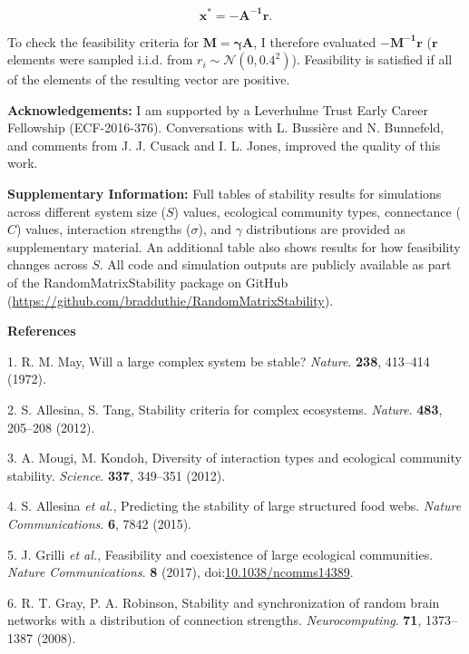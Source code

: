 \documentclass[]{article}
\begin{document}
\[\mathbf{x^{*} = -A^{-1}r}.\]

To check the feasibility criteria for \(\mathbf{M = \gamma A}\), I
therefore evaluated \(\mathbf{-M^{-1}r}\) (\(\mathbf{r}\) elements were
sampled i.i.d. from \(r_{i} \sim \mathcal{N}(0, 0.4^{2})\)). Feasibility
is satisfied if all of the elements of the resulting vector are
positive.

\textbf{Acknowledgements:} I am supported by a Leverhulme Trust Early
Career Fellowship (ECF-2016-376). Conversations with L. Bussière and N.
Bunnefeld, and comments from J. J. Cusack and I. L. Jones, improved the
quality of this work.

\textbf{Supplementary Information:} Full tables of stability results for
simulations across different system size (\(S\)) values, ecological
community types, connectance (\(C\)) values, interaction strengths
(\(\sigma\)), and \(\gamma\) distributions are provided as supplementary
material. An additional table also shows results for how feasibility
changes across \(S\). All code and simulation outputs are publicly
available as part of the RandomMatrixStability package on GitHub
(\url{https://github.com/bradduthie/RandomMatrixStability}).

\textbf{References}

\hypertarget{refs}{}
\hypertarget{ref-May1972}{}
1. R. M. May, Will a large complex system be stable? \emph{Nature}.
\textbf{238}, 413--414 (1972).

\hypertarget{ref-Allesina2012}{}
2. S. Allesina, S. Tang, Stability criteria for complex ecosystems.
\emph{Nature}. \textbf{483}, 205--208 (2012).

\hypertarget{ref-Mougi2012}{}
3. A. Mougi, M. Kondoh, Diversity of interaction types and ecological
community stability. \emph{Science}. \textbf{337}, 349--351 (2012).

\hypertarget{ref-Allesina2015}{}
4. S. Allesina \emph{et al.}, Predicting the stability of large
structured food webs. \emph{Nature Communications}. \textbf{6}, 7842
(2015).

\hypertarget{ref-Grilli2017}{}
5. J. Grilli \emph{et al.}, Feasibility and coexistence of large
ecological communities. \emph{Nature Communications}. \textbf{8} (2017),
doi:\href{https://doi.org/10.1038/ncomms14389}{10.1038/ncomms14389}.

\hypertarget{ref-Gray2008}{}
6. R. T. Gray, P. A. Robinson, Stability and synchronization of random
brain networks with a distribution of connection strengths.
\emph{Neurocomputing}. \textbf{71}, 1373--1387 (2008).
\end{document}
